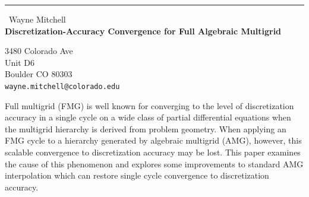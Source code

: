 \documentclass{report}
\begin{document}
\begin{center}
\rule{6in}{1pt} \
{\large Wayne Mitchell \\
{\bf Discretization-Accuracy Convergence for Full Algebraic Multigrid}}

3480 Colorado Ave \\ Unit D6 \\ Boulder CO 80303
\\
{\tt wayne.mitchell@colorado.edu}\end{center}

Full multigrid (FMG) is well known for converging to the level of
discretization accuracy in a single cycle on a wide class of partial
differential equations when the multigrid hierarchy is derived from
problem geometry. When applying an FMG cycle to a hierarchy generated by
algebraic multigrid (AMG), however, this scalable convergence to
discretization accuracy may be lost. This paper examines the cause of
this phenomenon and explores some improvements to standard AMG
interpolation which can restore single cycle convergence to
discretization accuracy.
\end{document}
